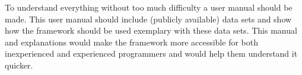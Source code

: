\documentclass[10pt,a4paper]{article}
\begin{document}
	To understand everything without too much difficulty a user manual should be made. This user manual should include (publicly available) data sets and show how the framework should be used exemplary with these data sets. This manual and explanations would make the framework more accessible for both inexperienced and experienced programmers and would help them understand it quicker.
	
	 
	
	
	\appendix
	
\end{document}
